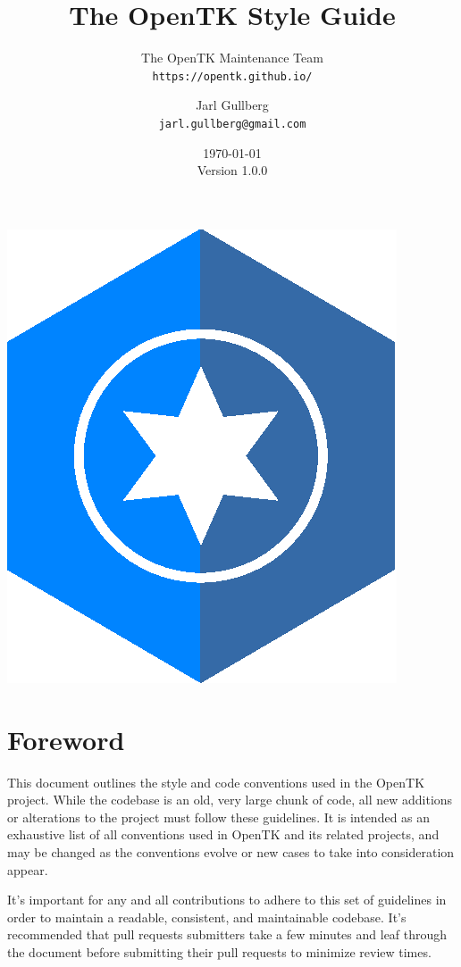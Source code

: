 \documentclass[11pt,a4paper]{article}
\title
{
    \textbf
    {
        The OpenTK Style Guide
    }
}
\author
{
    The OpenTK Maintenance Team\\
    \texttt{https://opentk.github.io/}
    \and
    Jarl Gullberg\\
    \texttt{jarl.gullberg@gmail.com}
}
\date
{
    \today\\
    Version 1.0.0
}
\begin{document}
\maketitle

\begin{center}
    \includegraphics[scale=1]{opentk-blue-hexagon}
\end{center}

\pagebreak
\tableofcontents

\pagebreak
\listoffigures

\pagebreak
\section*{Foreword}
This document outlines the style and code conventions used in the OpenTK project. While the codebase is an old, very large chunk of code, all new additions or alterations to the project must follow these guidelines. It is intended as an exhaustive list of all conventions used in OpenTK and its related projects, and may be changed as the conventions evolve or new cases to take into consideration appear. 

It's important for any and all contributions to adhere to this set of guidelines in order to maintain a readable, consistent, and maintainable codebase. It's recommended that pull requests submitters take a few minutes and leaf through the document before submitting their pull requests to minimize review times.
\end{document}
